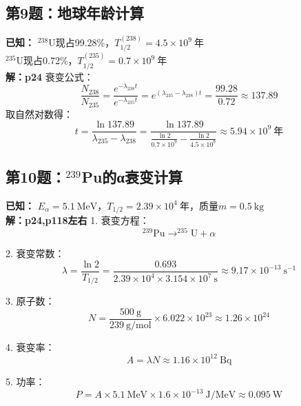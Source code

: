 \documentclass{article}
\begin{document}
\subsection*{第9题：地球年龄计算}
\textbf{已知：} $^{238}$U现占99.28\%，$T_{1/2}^{(238)} = 4.5 \times 10^9\ \mathrm{年}$\\
$^{235}$U现占0.72\%，$T_{1/2}^{(235)} = 0.7 \times 10^9\ \mathrm{年}$\\
\textbf{解：p24}
衰变公式：
$$
\frac{N_{238}}{N_{235}} = \frac{e^{-\lambda_{238}t}}{e^{-\lambda_{235}t}} = e^{(\lambda_{235}-\lambda_{238})t} = \frac{99.28}{0.72} \approx 137.89
$$
取自然对数得：
$$
t = \frac{\ln 137.89}{\lambda_{235} - \lambda_{238}} = \frac{\ln 137.89}{\frac{\ln 2}{0.7 \times 10^9} - \frac{\ln 2}{4.5 \times 10^9}} \approx 5.94 \times 10^9\ \mathrm{年}
$$

\subsection*{第10题：$^{239}$Pu的α衰变计算}
\textbf{已知： } $E_\alpha = 5.1\ \mathrm{MeV}$，$T_{1/2} = 2.39 \times 10^4\ \mathrm{年}$，质量$m=0.5\ \mathrm{kg}$\\
\textbf{解：p24,p118左右}
1. 衰变方程：
$$
^{239}\mathrm{Pu} \to ^{235}\mathrm{U} + \alpha
$$

2. 衰变常数：
$$
\lambda = \frac{\ln 2}{T_{1/2}} = \frac{0.693}{2.39 \times 10^4 \times 3.154 \times 10^7\ \mathrm{s}} \approx 9.17 \times 10^{-13}\ \mathrm{s^{-1}}
$$

3. 原子数：
$$
N = \frac{500\ \mathrm{g}}{239\ \mathrm{g/mol}} \times 6.022 \times 10^{23} \approx 1.26 \times 10^{24}
$$

4. 衰变率：
$$
A = \lambda N \approx 1.16 \times 10^{12}\ \mathrm{Bq}
$$

5. 功率：
$$
P = A \times 5.1\ \mathrm{MeV} \times 1.6 \times 10^{-13}\ \mathrm{J/MeV} \approx 0.095\ \mathrm{W}
$$
\end{document}
